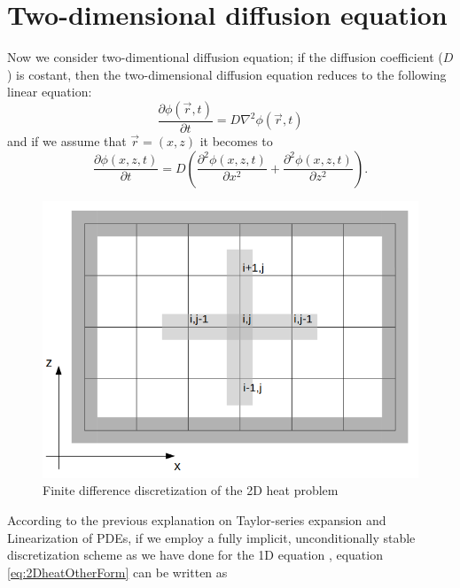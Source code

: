 \section{Two-dimensional diffusion equation}
Now we consider two-dimentional diffusion equation; if the diffusion coefficient ($D$) is costant, then  the two-dimensional diffusion equation reduces to the following linear equation:
\begin{equation}
\label{eq:2Dheat}
\frac{\partial \phi(\vec{r},t)}{\partial t}= D \nabla^2 \phi(\vec{r},t)
\end{equation}
and if we assume that $\vec{r}=(x,z)$ it becomes to
\begin{equation}
\label{eq:2DheatOtherForm}
\frac{\partial \phi(x,z,t)}{\partial t}= D \left( \frac{\partial ^2 \phi(x,z,t)}{\partial x^2} +\frac{\partial ^2 \phi(x,z,t)}{\partial z^2} \right).
\end{equation}

\begin{figure}[ht]\centering
\includegraphics[width=\linewidth]{2d-grid}
\caption{Finite difference discretization of the 2D heat problem}
\label{fig:2d-grid}
\end{figure}

According to the previous explanation on Taylor-series expansion and Linearization of PDEs, if we employ a fully implicit, unconditionally stable discretization scheme as we have done for the 1D equation , equation \ref{eq:2DheatOtherForm} can be written as

